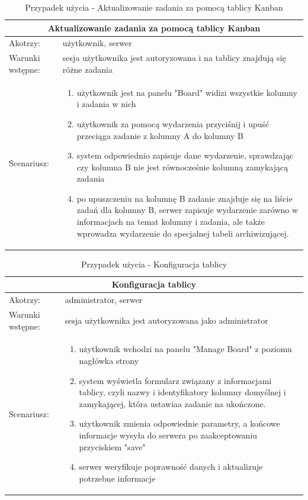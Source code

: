 \begin{table}[h!]
	\begin{tabular}{|p{2cm}||p{13cm}|  }
		
		
		
		\hline
		\multicolumn{2}{|c|}{Aktualizowanie zadania za pomocą tablicy Kanban} \\
		\hline
		Akotrzy: & użytkownik, serwer \\
		\hline
		Warunki wstępne: & sesja użytkownika jest autoryzowana i na tablicy znajdują się różne zadania \\
		\hline
		Scenariusz: &
		\begin{enumerate}
			\item użytkownik jest na panelu "Board" widizi wszystkie kolumny i zadania w nich
			\item użytkownik za pomocą wydarzenia przyciśnij i upuść przeciąga zadanie z kolumny A do kolumny B
			\item system odpowiednio zapisuje dane wydarzenie, sprawdzając czy kolumna B nie jest równocześnie kolumną zamykającą zadania
			\item  po upuszczeniu na kolumnę B zadanie znajduje się na liście zadań dla kolumny B, serwer zapisuje wydarzenie zarówno w informacjach na temat kolumny i zadania, ale także wprowadza wydarzenie do specjalnej tabeli archiwizującej.
		\end{enumerate}\\
		\hline
	\end{tabular}
	\caption{Przypadek użycia - Aktualizowanie zadania za pomocą tablicy Kanban}
\end{table}


\begin{table}[h!]
	\begin{tabular}{|p{2cm}||p{13cm}|  }
		
		
		
		\hline
		\multicolumn{2}{|c|}{Konfiguracja tablicy} \\
		\hline
		Akotrzy: & administrator, serwer \\
		\hline
		Warunki wstępne: & sesja użytkownika jest autoryzowana jako administrator  \\
		\hline
		Scenariusz: &
		\begin{enumerate}
			\item użytkownik wchodzi na panelu "Manage Board" z poziomu nagłówka strony 
			\item system wyświetla formularz związany z informacjami tablicy, czyli nazwy i identyfikatory kolumny  domyślnej i  zamykającej, która ustawiaa zadanie na ukończone.
			\item  użytkownik zmienia odpowiednie parametry, a końcowe informacje wysyła do serwera po zaakceptowaniu przyciskiem "save"
			\item serwer weryfikuje poprawność danych i aktualizuje potrzebne informacje
		\end{enumerate}\\
		\hline
	\end{tabular}
	\caption{Przypadek użycia - Konfiguracja tablicy}
\end{table}


